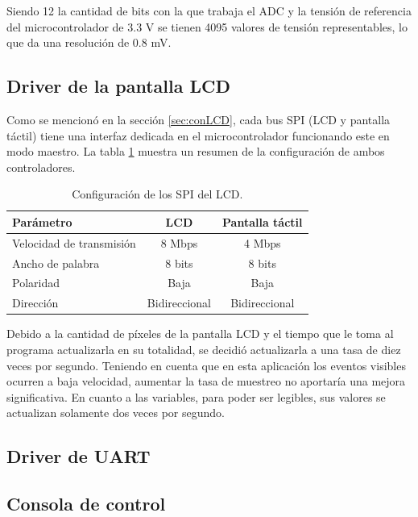 Siendo 12 la cantidad de bits con la que trabaja el ADC y la tensión de referencia del microcontrolador de 3.3 V se tienen 4095 valores de tensión representables, lo que da una resolución de 0.8 mV.

\subsection{Driver de la pantalla LCD}

Como se mencionó en la sección \ref{sec:conLCD}, cada bus SPI (LCD y pantalla táctil) tiene una interfaz dedicada en el microcontrolador funcionando este en modo maestro. La tabla \ref{tab:configSPI} muestra un resumen de la configuración de ambos controladores.

\begin{table}[H]
	\centering
	\caption{Configuración de los SPI del LCD.}
	\begin{tabular}{l c c}
		\toprule
		\textbf{Parámetro} & \textbf{LCD} & \textbf{Pantalla táctil} \\
		\midrule
		Velocidad de transmisión	& 8 Mbps & 4 Mbps	\\
		Ancho de palabra 				& 8 bits & 8 bits	    \\
		Polaridad							& Baja & Baja \\
		Dirección							& Bidireccional & Bidireccional \\
		\bottomrule
		\hline
	\end{tabular}
	\label{tab:configSPI}
\end{table}

Debido a la cantidad de píxeles de la pantalla LCD y el tiempo que le toma al programa actualizarla en su totalidad, se decidió actualizarla a una tasa de diez veces por segundo. Teniendo en cuenta que en esta aplicación los eventos visibles ocurren a baja velocidad, aumentar la tasa de muestreo no aportaría una mejora significativa. En cuanto a las variables, para poder ser legibles, sus valores se actualizan solamente dos veces por segundo.

\subsection{Driver de UART}



\subsection{Consola de control}

